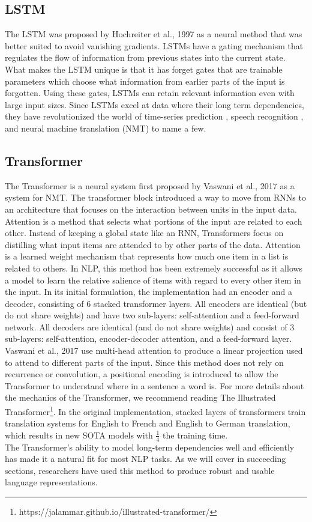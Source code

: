 \subsection{LSTM}
\label{chap:prior:sec:arch:lstm}
The LSTM was proposed by Hochreiter et al.,  1997 \cite{Hochreiter1997LongSM} as a neural method that was better suited to avoid vanishing gradients. LSTMs have a gating mechanism that regulates the flow of information from previous states into the current state. What makes the LSTM unique is that it has forget gates that are trainable parameters which choose what information from earlier parts of the input is forgotten. Using these gates, LSTMs can retain relevant information even with large input sizes. Since LSTMs excel at data where their long term dependencies, they have revolutionized the world of time-series prediction \cite{Sagheer2019TimeSF}, speech recognition \cite{Han2017ESEES}, and neural machine translation (NMT) \cite{Jean2015OnUV} to name a few. 
\subsection{Transformer}
\label{chap:prior:sec:arch:transformer}
The Transformer is a neural system first proposed by Vaswani et al., 2017  \cite{Vaswani2017AttentionIA} as a system for NMT. The transformer block introduced a way to move from RNNs to an architecture that focuses on the interaction between units in the input data. Attention is a method that selects what portions of the input are related to each other. Instead of keeping a global state like an RNN, Transformers focus on distilling what input items are attended to by other parts of the data. Attention is a learned weight mechanism that represents how much one item in a list is related to others. In NLP, this method has been extremely successful as it allows a model to learn the relative salience of items with regard to every other item in the input. In its initial formulation, the implementation had an encoder and a decoder, consisting of 6 stacked transformer layers. All encoders are identical (but do not share weights) and have two sub-layers: self-attention and a feed-forward network. All decoders are identical (and do not share weights) and consist of 3 sub-layers: self-attention, encoder-decoder attention, and a feed-forward layer. \\ 
Vaswani et al., 2017 use multi-head attention to produce a linear projection used to attend to different parts of the input. Since this method does not rely on recurrence or convolution, a positional encoding is introduced to allow the Transformer to understand where in a sentence a word is. For more details about the mechanics of the Transformer, we recommend reading The Illustrated Transformer\footnote{https://jalammar.github.io/illustrated-transformer/}. In the original implementation,  stacked layers of transformers train translation systems for English to French and English to German translation, which results in new SOTA models with $\frac{1}{4}$ the training time. \\
The Transformer's ability to model long-term dependencies well and efficiently has made it a natural fit for most NLP tasks. As we will cover in succeeding sections, researchers have used this method to produce robust and usable language representations.